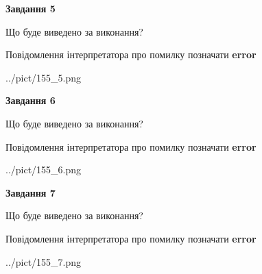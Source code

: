 \documentclass[10pt, ukrainian]{article}
\begin{document}
{\begin {large}
{\begin {center}\textbf{Завдання 5}\end {center}}\par
Що буде виведено за виконання? \par
Повідомлення інтерпретатора про помилку позначати \textbf{error}

\begin{center}
	{../pict/155_5.png}
\end{center}
\newpage

{\begin {center}\textbf{Завдання 6}\end {center}}\par
Що буде виведено за виконання? \par
Повідомлення інтерпретатора про помилку позначати \textbf{error}

\begin{center}
	{../pict/155_6.png}
\end{center}
\newpage

{\begin {center}\textbf{Завдання 7}\end {center}}\par
Що буде виведено за виконання? \par
Повідомлення інтерпретатора про помилку позначати \textbf{error}

\begin{center}
	{../pict/155_7.png}
\end{center}
\newpage

\end {large}}
\end{document}
